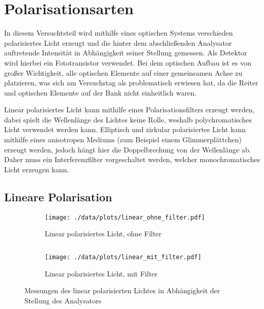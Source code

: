 \chapter{Polarisationsarten}
In diesem Versuchtsteil wird mithilfe eines optischen Systems verschieden polarisiertes Licht erzeugt und die hinter dem abschließenden Analysator auftretende Intensität in Abhängigkeit seiner Stellung gemessen.
Als Detektor wird hierbei ein Fototransistor verwendet.
Bei dem optischen Aufbau ist es von großer Wichtigkeit, alle optischen Elemente auf einer gemeinsamen Achse zu platzieren, was sich am Versuchstag als problematisch erwiesen hat, da die Reiter und optischen Elemente auf der Bank nicht einheitlich waren.\par
Linear polarisiertes Licht kann mithilfe eines Polarisationsfilters erzeugt werden, dabei spielt die Wellenlänge des Lichtes keine Rolle, weshalb polychromatisches Licht verwendet werden kann.
Elliptisch und zirkular polarisiertes Licht kann mithilfe eines anisotropen Mediums (zum Beispiel einem Glimmerplättchen) erzeugt werden, jedoch hängt hier die Doppelbrechung von der Wellenlänge ab.
Daher muss ein Interferenzfilter vorgeschaltet werden, welcher monochromatisches Licht erzeugen kann.

\section{Lineare Polarisation}
\begin{figure}[tb]
	\begin{subfigure}{.4\textwidth}
		\centering
		\texttt{[image: ./data/plots/linear\_ohne\_filter.pdf]}
		\caption[ohne Filter]{Linear polarisiertes Licht, ohne Filter}
		\label{subfig:lin_nofilt}
	\end{subfigure}
	$\quad$
	\begin{subfigure}{.4\textwidth}
		\centering
		\texttt{[image: ./data/plots/linear\_mit\_filter.pdf]}
		\caption[mit Filter]{Linear polarisiertes Licht, mit Filter}
		\label{subfig:lin_withfilt}
	\end{subfigure}
	\caption[Linear polarisiertes Licht]{Messungen des linear polarisierten Lichtes in Abhängigkeit der Stellung des Analysators}
	\label{fig:meas_lin}
\end{figure}

